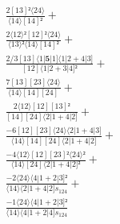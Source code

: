 \documentclass[varwidth, border=5pt]{standalone}
\begin{document}
\begin{my}
$\begin{gathered}
\scriptscriptstyle\frac{2[13]²⟨24⟩}{⟨14⟩[14]²} +\\
\scriptscriptstyle\frac{2⟨12⟩²[12]²⟨24⟩}{⟨13⟩²⟨14⟩[14]²} +\\
\scriptscriptstyle\frac{2/3[13]⟨1|𝟓|1]⟨1|2+4|3]}{[12]⟨1|2+3|4]²} +\\
\scriptscriptstyle\frac{7[13][23]⟨24⟩}{⟨14⟩[14][24]} +\\
\scriptscriptstyle\frac{2⟨12⟩[12][13]²}{[14][24]⟨2|1+4|2]} +\\
\scriptscriptstyle\frac{-6[12][23]⟨24⟩⟨2|1+4|3]}{⟨14⟩[14][24]⟨2|1+4|2]} +\\
\scriptscriptstyle\frac{-4⟨12⟩[12][23]²⟨24⟩²}{⟨14⟩[24]⟨2|1+4|2]²} +\\
\scriptscriptstyle\frac{-2⟨24⟩⟨4|1+2|3]²}{⟨14⟩⟨2|1+4|2]s_{124}} +\\
\scriptscriptstyle\frac{-1⟨24⟩⟨4|1+2|3]²}{⟨14⟩⟨4|1+2|4]s_{124}} \phantom{+}
\end{gathered}$
\end{my}
\end{document}
